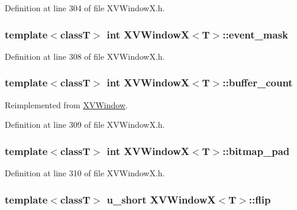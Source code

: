 Definition at line 304 of file XVWindow\-X.h.\label{XVWindowX_n7}
\hypertarget{class_XVWindowX_n7}{
\subsubsection[event_mask]{\setlength{\rightskip}{0pt plus 5cm}template$<$classT$>$ int XVWindow\-X$<$T$>$::event\_\-mask}}




Definition at line 308 of file XVWindow\-X.h.\label{XVWindowX_n8}
\hypertarget{class_XVWindowX_n8}{
\subsubsection[buffer_count]{\setlength{\rightskip}{0pt plus 5cm}template$<$classT$>$ int XVWindow\-X$<$T$>$::buffer\_\-count}}




Reimplemented from \hyperlink{class_XVWindow}{XVWindow}.

Definition at line 309 of file XVWindow\-X.h.\label{XVWindowX_n9}
\hypertarget{class_XVWindowX_n9}{
\subsubsection[bitmap_pad]{\setlength{\rightskip}{0pt plus 5cm}template$<$classT$>$ int XVWindow\-X$<$T$>$::bitmap\_\-pad}}




Definition at line 310 of file XVWindow\-X.h.\label{XVWindowX_n10}
\hypertarget{class_XVWindowX_n10}{
\subsubsection[flip]{\setlength{\rightskip}{0pt plus 5cm}template$<$classT$>$ u\_\-short XVWindow\-X$<$T$>$::flip}}




